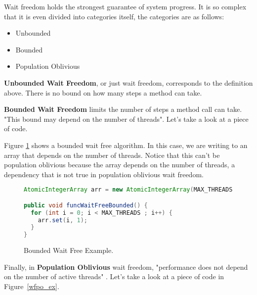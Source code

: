\documentclass[letterpaper, 12pt]{article}
\begin{document}
Wait freedom holds the strongest guarantee of system progress. It is so complex that it is 
even divided into categories itself, the categories are as follows:

\begin{itemize}
  \item Unbounded
  \item Bounded
  \item Population Oblivious
\end{itemize}
\newpage

{\bfseries Unbounded Wait Freedom}, or just wait freedom, corresponds to the definition above. There is no bound on how many steps a method can take. 

\par\vspace{\baselineskip}

{\bfseries Bounded Wait Freedom} limits the number of steps a method call can take. "This bound 
may depend on the number of threads"\citep[p. 59]{artofmulti}. Let's take a look at a 
piece of code. 
\par\vspace{\baselineskip}

Figure \ref{boundedwaitfree_ex} shows a bounded wait free algorithm. 
In this case, we are writing to an array that depends on the number of threads. Notice that this can't be 
population oblivious because the array depends on the number of threads, a dependency that is not 
true in population oblivious wait freedom.
\par\vspace{\baselineskip}

\begin{figure}[H]
\begin{lstlisting}[language=Java]
AtomicIntegerArray arr = new AtomicIntegerArray(MAX_THREADS);

public void funcWaitFreeBounded() {
  for (int i = 0; i < MAX_THREADS ; i++) {
    arr.set(i, 1);
  }
}
\end{lstlisting}
\caption{Bounded Wait Free Example.\citep{concurrencyfreaks}} \label{boundedwaitfree_ex}
\end{figure}
 

Finally, in {\bfseries Population Oblivious} wait freedom, "performance does not depend on the 
number of active threads" \citep[p. 59]{artofmulti}. Let's take a look at a piece of code in
Figure~\ref{wfpo_ex}.
\par\vspace{\baselineskip}
\end{document}
